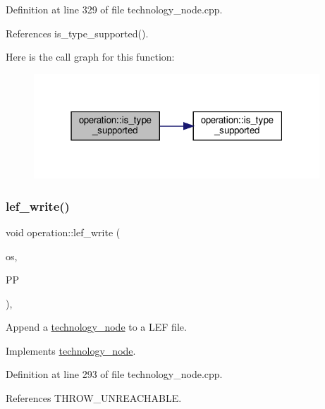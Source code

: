 Definition at line 329 of file technology\+\_\+node.\+cpp.



References is\+\_\+type\+\_\+supported().

Here is the call graph for this function\+:
\nopagebreak
\begin{figure}[H]
\begin{center}
\leavevmode
\includegraphics[width=304pt]{d9/dc0/structoperation_a2fbbfb27340dda2d4b29952781b32150_cgraph}
\end{center}
\end{figure}
\mbox{\label{structoperation_aa6451ee75f5e5db619448ae294fc85d3}} 
\subsubsection{\texorpdfstring{lef\+\_\+write()}{lef\_write()}}
{\footnotesize\ttfamily void operation\+::lef\+\_\+write (\begin{DoxyParamCaption}\item[{std\+::ofstream \&}]{os,  }\item[{const \hyperlink{simple__indent_8hpp_ad85cff64e49d5dbf5cefe96f411c720e}{simple\+\_\+indent\+Ref}}]{PP }\end{DoxyParamCaption})\hspace{0.3cm}{\ttfamily [override]}, {\ttfamily [virtual]}}



Append a \hyperlink{structtechnology__node}{technology\+\_\+node} to a L\+EF file. 



Implements \hyperlink{structtechnology__node_a2a92a701dec7c32a6bee6f66576f1fc6}{technology\+\_\+node}.



Definition at line 293 of file technology\+\_\+node.\+cpp.



References T\+H\+R\+O\+W\+\_\+\+U\+N\+R\+E\+A\+C\+H\+A\+B\+LE.

